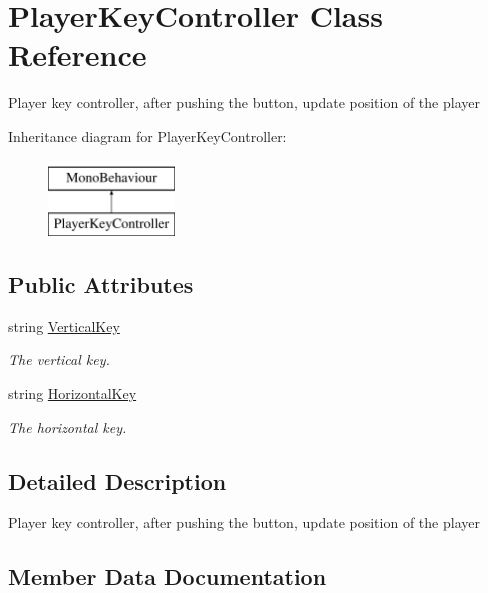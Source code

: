 \hypertarget{class_player_key_controller}{}\section{Player\+Key\+Controller Class Reference}
\label{class_player_key_controller}


Player key controller, after pushing the button, update position of the player  


Inheritance diagram for Player\+Key\+Controller\+:\begin{figure}[H]
\begin{center}
\leavevmode
\includegraphics[height=2.000000cm]{class_player_key_controller}
\end{center}
\end{figure}
\subsection*{Public Attributes}
\begin{DoxyCompactItemize}
\item 
string \mbox{\hyperlink{class_player_key_controller_af6f283b7608be96f62f9af15b75c2691}{Vertical\+Key}}
\begin{DoxyCompactList}\small\item\em The vertical key. \end{DoxyCompactList}\item 
string \mbox{\hyperlink{class_player_key_controller_a0905f484ede4072fc87e2c7e46d45bed}{Horizontal\+Key}}
\begin{DoxyCompactList}\small\item\em The horizontal key. \end{DoxyCompactList}\end{DoxyCompactItemize}


\subsection{Detailed Description}
Player key controller, after pushing the button, update position of the player 



\subsection{Member Data Documentation}
\mbox{\label{class_player_key_controller_a0905f484ede4072fc87e2c7e46d45bed}} 
